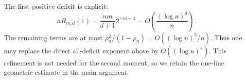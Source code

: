 \begin{remark}
The first positive deficit is explicit:
\[
  nR_{m,d}(1)
  =
  \frac{nm}{d+1}2^{-m+1}
  =O\!\left(\frac{(\log n)^3}{n}\right).
\]
The remaining terms are at most
$\rho_n^2/(1-\rho_n)=O((\log n)^5/n)$.  Thus one may replace the direct
all-deficit exponent above by $O((\log n)^4)$.  This refinement is not needed
for the second moment, so we retain the one-line geometric estimate in the main
argument.
\end{remark}

